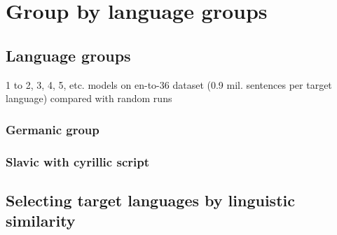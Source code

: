 \chapter{Group by language groups}

\section{Language groups}
1 to 2, 3, 4, 5, etc. models on en-to-36 dataset (0.9 mil. sentences per target language)
compared with random runs
\subsection{Germanic group}
\subsection{Slavic with cyrillic script}

\section{Selecting target languages by linguistic similarity}

